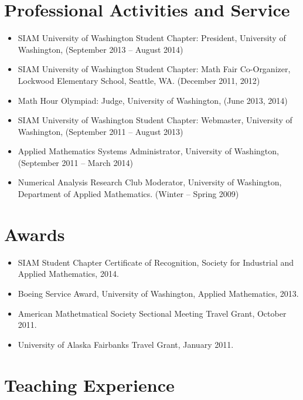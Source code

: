 \documentclass{article}
\begin{document}
\section*{Professional Activities and Service}



\begin{itemize}
  \item {SIAM University of Washington Student Chapter: President},
    University of Washington, (September 2013 -- August 2014)
  \item {SIAM University of Washington Student Chapter: Math Fair
    Co-Organizer}, Lockwood Elementary School, Seattle, WA. (December
    2011, 2012)
  \item {Math Hour Olympiad: Judge}, University of Washington, (June
    2013, 2014)
  \item {SIAM University of Washington Student Chapter: Webmaster},
    University of Washington, (September 2011 -- August 2013)
  \item {Applied Mathematics Systems Administrator}, University of
    Washington, (September 2011 -- March 2014)
  \item {Numerical Analysis Research Club Moderator}, University of
    Washington, Department of Applied Mathematics. (Winter -- Spring
    2009)
\end{itemize}


\section*{Awards}

\begin{itemize}
  \item SIAM Student Chapter Certificate of Recognition, Society for
    Industrial and Applied Mathematics, 2014.
  \item Boeing Service Award, University of Washington, Applied
    Mathematics, 2013.
  \item American Mathetmatical Society Sectional Meeting Travel Grant,
    October 2011.
  \item University of Alaska Fairbanks Travel Grant, January 2011.
\end{itemize}


\section*{Teaching Experience}
\end{document}
